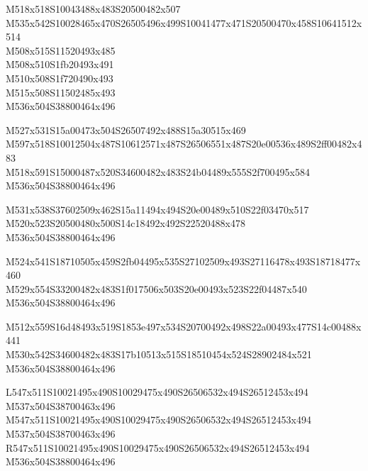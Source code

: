 \documentclass{article}
\begin{document}
\begin{multicols}{5}
\begin{center}

M518x518S10043488x483S20500482x507 %
\\M535x542S10028465x470S26505496x499S10041477x471S20500470x458S10641512x514 %
\\M508x515S11520493x485 %
\\M508x510S1fb20493x491 %
\\M510x508S1f720490x493 %
\\M515x508S11502485x493 %
\\M536x504S38800464x496 %

M527x531S15a00473x504S26507492x488S15a30515x469 %
\\M597x518S10012504x487S10612571x487S26506551x487S20e00536x489S2ff00482x483 %
\\M518x591S15000487x520S34600482x483S24b04489x555S2f700495x584 %
\\M536x504S38800464x496 %

M531x538S37602509x462S15a11494x494S20e00489x510S22f03470x517 %
\\M520x523S20500480x500S14c18492x492S22520488x478 %
\\M536x504S38800464x496 %

M524x541S18710505x459S2fb04495x535S27102509x493S27116478x493S18718477x460 %
\\M529x554S33200482x483S1f017506x503S20e00493x523S22f04487x540 %
\\M536x504S38800464x496 %

M512x559S16d48493x519S1853e497x534S20700492x498S22a00493x477S14c00488x441 %
\\M530x542S34600482x483S17b10513x515S18510454x524S28902484x521 %
\\M536x504S38800464x496 %

L547x511S10021495x490S10029475x490S26506532x494S26512453x494 %
\\M537x504S38700463x496 %
\\M547x511S10021495x490S10029475x490S26506532x494S26512453x494 %
\\M537x504S38700463x496 %
\\R547x511S10021495x490S10029475x490S26506532x494S26512453x494 %
\\M536x504S38800464x496 %


\end{center}
\end{multicols}
\end{document}
